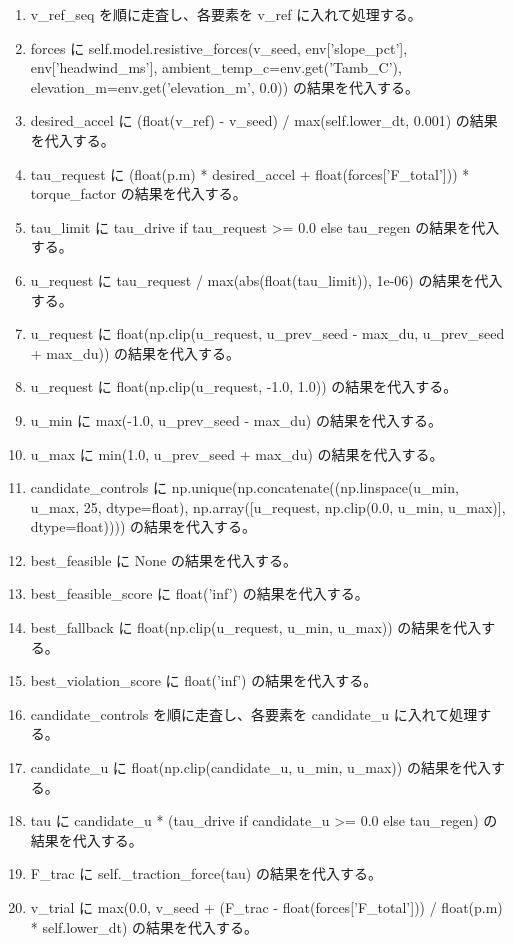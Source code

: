 \documentclass[a4paper,11pt]{article}
\begin{document}
\begin{enumerate}[leftmargin=1.8em]
\item v\_ref\_seq を順に走査し、各要素を v\_ref に入れて処理する。
\item   forces に self.model.resistive\_forces(v\_seed, env['slope\_pct'], env['headwind\_ms'], ambient\_temp\_c=env.get('Tamb\_C'), elevation\_m=env.get('elevation\_m', 0.0)) の結果を代入する。
\item   desired\_accel に (float(v\_ref) - v\_seed) / max(self.lower\_dt, 0.001) の結果を代入する。
\item   tau\_request に (float(p.m) * desired\_accel + float(forces['F\_total'])) * torque\_factor の結果を代入する。
\item   tau\_limit に tau\_drive if tau\_request >= 0.0 else tau\_regen の結果を代入する。
\item   u\_request に tau\_request / max(abs(float(tau\_limit)), 1e-06) の結果を代入する。
\item   u\_request に float(np.clip(u\_request, u\_prev\_seed - max\_du, u\_prev\_seed + max\_du)) の結果を代入する。
\item   u\_request に float(np.clip(u\_request, -1.0, 1.0)) の結果を代入する。
\item   u\_min に max(-1.0, u\_prev\_seed - max\_du) の結果を代入する。
\item   u\_max に min(1.0, u\_prev\_seed + max\_du) の結果を代入する。
\item   candidate\_controls に np.unique(np.concatenate((np.linspace(u\_min, u\_max, 25, dtype=float), np.array([u\_request, np.clip(0.0, u\_min, u\_max)], dtype=float)))) の結果を代入する。
\item   best\_feasible に None の結果を代入する。
\item   best\_feasible\_score に float('inf') の結果を代入する。
\item   best\_fallback に float(np.clip(u\_request, u\_min, u\_max)) の結果を代入する。
\item   best\_violation\_score に float('inf') の結果を代入する。
\item   candidate\_controls を順に走査し、各要素を candidate\_u に入れて処理する。
\item     candidate\_u に float(np.clip(candidate\_u, u\_min, u\_max)) の結果を代入する。
\item     tau に candidate\_u * (tau\_drive if candidate\_u >= 0.0 else tau\_regen) の結果を代入する。
\item     F\_trac に self.\_traction\_force(tau) の結果を代入する。
\item     v\_trial に max(0.0, v\_seed + (F\_trac - float(forces['F\_total'])) / float(p.m) * self.lower\_dt) の結果を代入する。

\end{enumerate}
\end{document}
